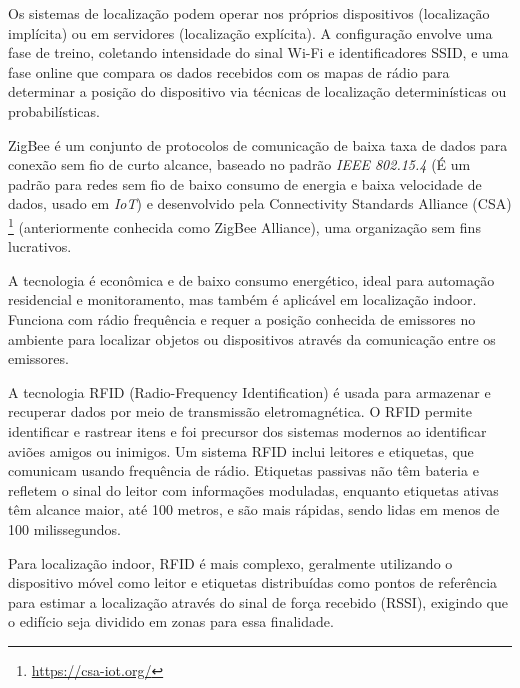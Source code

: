Os sistemas de localização podem operar nos próprios dispositivos (localização implícita) ou em servidores (localização explícita).
A configuração envolve uma fase de treino, coletando intensidade do sinal Wi-Fi e identificadores SSID, e uma fase online que compara os dados recebidos com os mapas de rádio para determinar a posição do dispositivo via técnicas de localização determinísticas ou probabilísticas.

\label{subsubsubsec:zigbee}
ZigBee é um conjunto de protocolos de comunicação de baixa taxa de dados para conexão sem fio de curto alcance, baseado no padrão \textit{IEEE 802.15.4} (É um padrão para redes sem fio de baixo consumo de energia e baixa velocidade de dados, usado em \textit{IoT}) e desenvolvido pela Connectivity Standards Alliance (CSA) \footnote{\url{https://csa-iot.org/}} (anteriormente conhecida como ZigBee Alliance), uma organização sem fins lucrativos.

A tecnologia é econômica e de baixo consumo energético, ideal para automação residencial e monitoramento, mas também é aplicável em localização indoor.
Funciona com rádio frequência e requer a posição conhecida de emissores no ambiente para localizar objetos ou dispositivos através da comunicação entre os emissores.

\label{subsubsubsec:rfid}
A tecnologia RFID (Radio-Frequency Identification) é usada para armazenar e recuperar dados por meio de transmissão eletromagnética.
O RFID permite identificar e rastrear itens e foi precursor dos sistemas modernos ao identificar aviões amigos ou inimigos.
Um sistema RFID inclui leitores e etiquetas, que comunicam usando frequência de rádio.
Etiquetas passivas não têm bateria e refletem o sinal do leitor com informações moduladas, enquanto etiquetas ativas têm alcance maior, até 100 metros, e são mais rápidas, sendo lidas em menos de 100 milissegundos.

Para localização indoor, RFID é mais complexo, geralmente utilizando o dispositivo móvel como leitor e etiquetas distribuídas como pontos de referência para estimar a localização através do sinal de força recebido (RSSI), exigindo que o edifício seja dividido em zonas para essa finalidade.